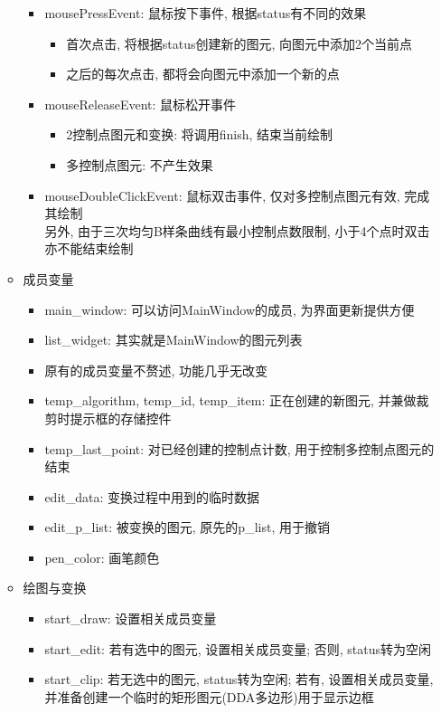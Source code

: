 \documentclass[a4paper,UTF8]{article}
\theoremstyle{definition}
\begin{document}
\begin{itemize}
\begin{itemize}
\begin{itemize}
      \item mousePressEvent: 鼠标按下事件, 根据status有不同的效果\begin{itemize}
        \item 首次点击, 将根据status创建新的图元, 向图元中添加2个当前点
        \item 之后的每次点击, 都将会向图元中添加一个新的点
      \end{itemize}
      \item mouseReleaseEvent: 鼠标松开事件\begin{itemize}
        \item 2控制点图元和变换: 将调用finish, 结束当前绘制
        \item 多控制点图元: 不产生效果
      \end{itemize}
      \item mouseDoubleClickEvent: 鼠标双击事件, 仅对多控制点图元有效, 完成其绘制\\
      另外, 由于三次均匀B样条曲线有最小控制点数限制, 小于4个点时双击亦不能结束绘制
    \end{itemize}
    \item 成员变量\begin{itemize}
      \item main\_window: 可以访问MainWindow的成员, 为界面更新提供方便
      \item list\_widget: 其实就是MainWindow的图元列表
      \item 原有的成员变量不赘述, 功能几乎无改变
      \item temp\_algorithm, temp\_id, temp\_item: 正在创建的新图元, 并兼做裁剪时提示框的存储控件
      \item temp\_last\_point: 对已经创建的控制点计数, 用于控制多控制点图元的结束
      \item edit\_data: 变换过程中用到的临时数据
      \item edit\_p\_list: 被变换的图元, 原先的p\_list, 用于撤销
      \item pen\_color: 画笔颜色
    \end{itemize}
    \item 绘图与变换\begin{itemize}
      \item start\_draw: 设置相关成员变量
      \item start\_edit: 若有选中的图元, 设置相关成员变量; 否则, status转为空闲
      \item start\_clip: 若无选中的图元, status转为空闲; 若有, 设置相关成员变量, 并准备创建一个临时的矩形图元(DDA多边形)用于显示边框

\end{itemize}
\end{itemize}
\end{itemize}
\end{document}

